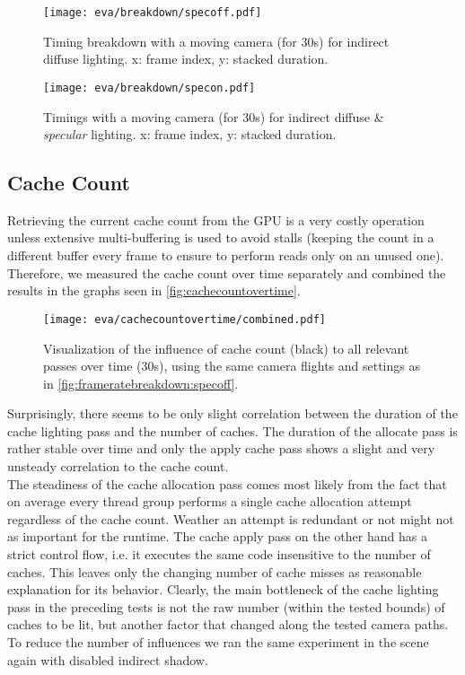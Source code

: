 \documentclass[thesis.tex]{subfiles}
\begin{document}
\begin{figure}
\centering
\texttt{[image: eva/breakdown/specoff.pdf]}
\caption{Timing breakdown with a moving camera (for 30s) for indirect diffuse lighting. x: frame index, y: stacked duration.}
\label{fig:frameratebreakdown:specoff}
\end{figure}
\begin{figure}
\centering
\texttt{[image: eva/breakdown/specon.pdf]}
\caption{Timings with a moving camera  (for 30s) for indirect diffuse \& \emph{specular} lighting. x: frame index, y: stacked duration.}
\label{fig:frameratebreakdown:specon}
\end{figure}

\subsection{Cache Count}
Retrieving the current cache count from the GPU is a very costly operation unless extensive multi-buffering is used to avoid stalls (keeping the count in a different buffer every frame to ensure to perform reads only on an unused one).
Therefore, we measured the cache count over time separately and combined the results in the graphs seen in \autoref{fig:cachecountovertime}.

\begin{figure}
\centering
\texttt{[image: eva/cachecountovertime/combined.pdf]}
\caption{Visualization of the influence of cache count (black) to all relevant passes over time (30s), using the same camera flights and settings as in \autoref{fig:frameratebreakdown:specoff}.}
\label{fig:cachecountovertime}
\end{figure}

Surprisingly, there seems to be only slight correlation between the duration of the cache lighting pass and the number of caches.
The duration of the allocate pass is rather stable over time and only the apply cache pass shows a slight and very unsteady correlation to the cache count.
\\
The steadiness of the cache allocation pass comes most likely from the fact that on average every thread group performs a single cache allocation attempt regardless of the cache count.
Weather an attempt is redundant or not might not as important for the runtime.
The cache apply pass on the other hand has a strict control flow, i.e. it executes the same code insensitive to the number of caches.
This leaves only the changing number of cache misses as reasonable explanation for its behavior.
Clearly, the main bottleneck of the cache lighting pass in the preceding tests is not the raw number (within the tested bounds) of caches to be lit, but another factor that changed along the tested camera paths.
To reduce the number of influences we ran the same experiment in the  scene again with disabled indirect shadow.
\end{document}
